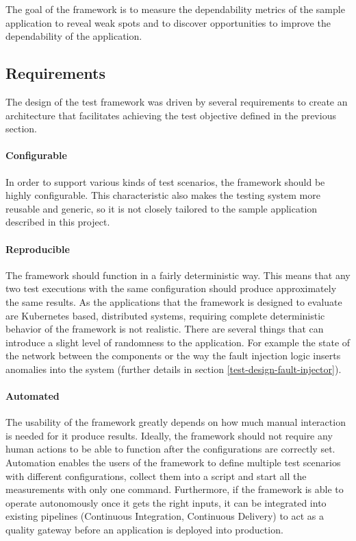 The goal of the framework is to measure the dependability metrics of the sample application to reveal weak spots and to discover opportunities to improve the dependability of the application.

\subsection{Requirements}

The design of the test framework was driven by several requirements to create an architecture that facilitates achieving the test objective defined in the previous section.

\paragraph{Configurable} In order to support various kinds of test scenarios, the framework should be highly configurable. This characteristic also makes the testing system more reusable and generic, so it is not closely tailored to the sample application described in this project.

\paragraph{Reproducible} The framework should function in a fairly deterministic way. This means that any two test executions with the same configuration should produce approximately the same results. As the applications that the framework is designed to evaluate are Kubernetes based, distributed systems, requiring complete deterministic behavior of the framework is not realistic. There are several things that can introduce a slight level of randomness to the application. For example the state of the network between the components or the way the fault injection logic inserts anomalies into the system (further details in section \ref{test-design-fault-injector}).

\paragraph{Automated} The usability of the framework greatly depends on how much manual interaction is needed for it produce results. Ideally, the framework should not require any human actions to be able to function after the configurations are correctly set. Automation enables the users of the framework to define multiple test scenarios with different configurations, collect them into a script and start all the measurements with only one command. Furthermore, if the framework is able to operate autonomously once it gets the right inputs, it can be integrated into existing pipelines (Continuous Integration, Continuous Delivery) to act as a quality gateway before an application is deployed into production.

